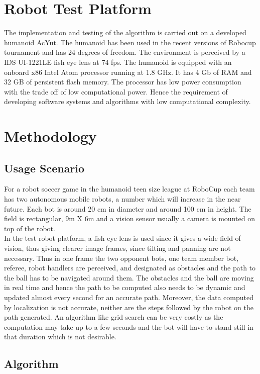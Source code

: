 \documentclass[letterpaper, 10 pt, conference]{ieeeconf}  %
\begin{document}
\section{Robot Test Platform}
The implementation and testing of the algorithm is carried out on a developed humanoid AcYut. The humanoid has been used in the recent versions of Robocup tournament and has 24 degrees of freedom. The environment is perceived by a IDS UI-1221LE fish eye lens at 74 fps. The humanoid is equipped with an onboard x86 Intel Atom processor running at 1.8 GHz. It has 4 Gb of RAM and 32 GB of persistent flash memory. The processor has low power consumption with the trade off of low computational power. Hence the requirement of developing software systems and algorithms with low computational complexity.

\section{Methodology}
\subsection{Usage Scenario}
For a robot soccer game in the humanoid teen size league at RoboCup each team has two autonomous mobile robots, a number which will increase in the near future. Each bot is around 20 cm in diameter and around 100 cm in height. The field is
rectangular, 9m X 6m and a vision sensor usually a camera is mounted on top of the robot. \\
In the test robot platform, a fish eye lens is used since it gives a wide field of vision, thus giving clearer image frames, since tilting and panning are not necessary. Thus in one frame the two opponent bots, one team member bot,
referee, robot handlers are perceived, and designated as obstacles and the path to the ball has to be navigated around them. The obstacles and the ball are moving in real time and hence the path to be computed also needs to be dynamic and updated almost every second for an accurate path. Moreover, the data computed by localization is not accurate, neither are the steps followed by the robot on the path generated. An algorithm like grid search can be very costly as the computation may take up to a few seconds and the bot will have to stand still in that duration which is not desirable.

\subsection{Algorithm}
\end{document}
